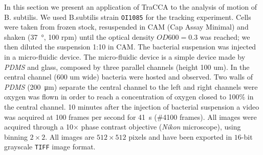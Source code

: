 \documentclass[conference]{IEEEtran}
\begin{document}
In this section we present an application of TraCCA to the analysis of motion of B. subtilis.
We used B.subtilis strain \texttt{OI1085} for the tracking experiment. Cells were taken from frozen stock, resuspended in CAM (Cap Assay Minimal) and shaken  (\SI{37}{\degree}, 100 rpm) until the optical density $OD600=0.3$ was reached; we then diluted the suspension 1:10 in CAM. The bacterial suspension was injected in a micro-fluidic device. The micro-fluidic device is a simple device made by \textit{PDMS} and glass, composed by three parallel channels (height 100 um). In the central channel (600 um wide) bacteria were hosted and observed. Two  walls of \textit{PDMS} (\SI{200}{\micro\metre}) separate the central channel to the left and right channels were oxygen was flown in order to reach a concentration of oxygen closed to 100\% in the central channel. 10 minutes after the injection of bacterial suspension a video was acquired at 100 frames per second for \SI{41}{\second}  (\#4100 frames). All images were acquired through a 10$\times$ phase contrast objective (\textit{Nikon} microscope), using binning $2 \times 2$.
All images are $512 \times 512$ pixels and have been exported in $16$-bit grayscale \texttt{TIFF} image format.
\end{document}
